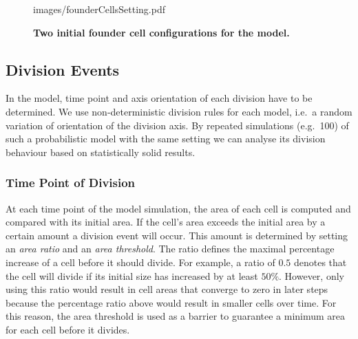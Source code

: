 \documentclass[11pt,a4paper, final]{article}
\begin{document}
%
\begin{figure}[htbp]
	\begin{center}
		\begin{overpic}[width=0.8\linewidth]{images/founderCellsSetting.pdf}
		\end{overpic}
\caption[]
{
{\bf Two initial founder cell configurations for the model.}
}
	\label{fig:founderCellsSetting}
	\end{center}
\end{figure}
%

\subsection{Division Events}
\noindent
In the model, time point and axis orientation of each division have to be determined. We use non-deterministic division rules for each model, i.e.\ a random variation of orientation of the division axis. By repeated simulations (e.g.\ 100) of such a probabilistic model with the same setting we can analyse its division behaviour based on statistically solid results.

\subsubsection{Time Point of Division}
\noindent
At each time point of the model simulation, the area of each cell is computed and compared with its initial area. If the cell's area exceeds the initial area by a certain amount a division event will occur. This amount is determined by setting an \textit{area ratio} and an \textit{area threshold}. The ratio defines the maximal percentage increase of a cell before it should divide. For example, a ratio of $0.5$ denotes that the cell will divide if its initial size has increased by at least $50\%$. However, only using this ratio would result in cell areas that converge to zero in later steps because the percentage ratio above would result in smaller cells over time. For this reason, the area threshold is used as a barrier to guarantee a minimum area for each cell before it divides.
\end{document}
